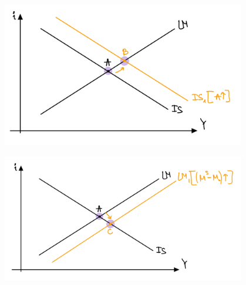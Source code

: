 \documentclass[a4paper,11pt]{article}
\begin{document}
\begin{RTL}
\begin{figure}[H]
    \begin{small}
        \begin{center}
            \includegraphics[width=0.95\textwidth]{figures/ISLM IS move.png}
        \end{center}
        \label{fig:}
    \end{small}
\end{figure}

\begin{figure}[H]
    \begin{small}
        \begin{center}
            \includegraphics[width=0.95\textwidth]{figures/ISLM LM Move.png}
        \end{center}
        \label{fig:}
    \end{small}
\end{figure}



\end{RTL}
\end{document}
